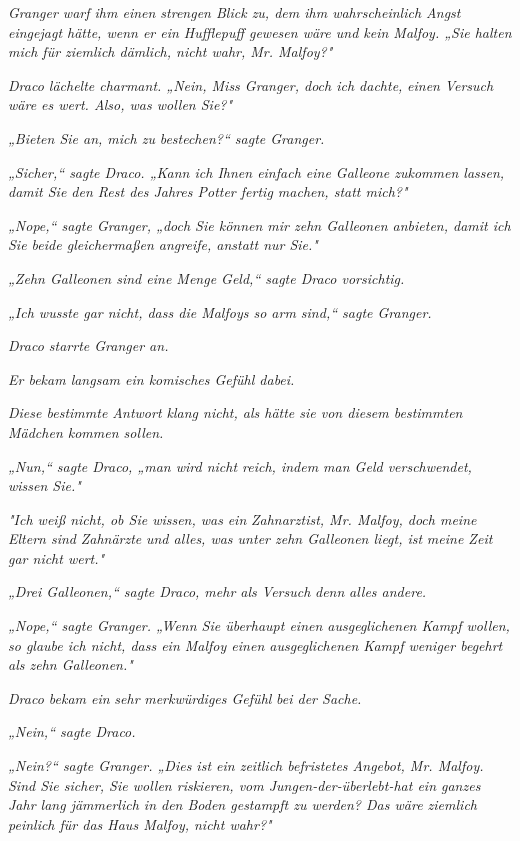 {\emph{Granger warf ihm einen strengen Blick zu, dem ihm wahrscheinlich Angst eingejagt hätte, wenn er ein Hufflepuff gewesen wäre und kein Malfoy. „Sie halten mich für ziemlich dämlich, nicht wahr, Mr. Malfoy?"}

\emph{Draco lächelte charmant. „Nein, Miss Granger, doch ich dachte,} \emph{einen} \emph{\emph{Versuch}} \emph{wäre es wert. Also, was wollen Sie?"}

\emph{„Bieten Sie an, mich zu} \emph{\emph{bestechen?}“ sagte Granger.}

\emph{„Sicher,“ sagte Draco. „Kann ich Ihnen einfach eine Galleone zukommen lassen, damit Sie den Rest des Jahres Potter fertig machen, statt mich?"}

\emph{„Nope,“ sagte Granger, „doch Sie können mir zehn Galleonen anbieten, damit ich Sie beide gleichermaßen angreife, anstatt nur Sie."}

\emph{„Zehn Galleonen sind eine Menge Geld,“ sagte Draco vorsichtig.}

\emph{„Ich wusste gar nicht, dass die Malfoys so arm sind,“ sagte Granger.}

\emph{Draco starrte Granger an.}

\emph{Er bekam langsam ein komisches Gefühl dabei.}

\emph{Diese bestimmte Antwort klang nicht, als hätte sie von diesem bestimmten Mädchen kommen sollen.}

\emph{„Nun,“ sagte Draco, „man wird nicht reich, indem man Geld verschwendet, wissen Sie."}

\emph{"Ich weiß nicht, ob Sie wissen, was} \emph{ein} \emph{Zahnarztist, Mr. Malfoy, doch meine Eltern sind} \emph{\emph{Zahnärzte}} \emph{und alles, was unter zehn Galleonen liegt, ist} \emph{meine Zeit gar nicht wert."}

\emph{„Drei Galleonen,“ sagte Draco, mehr als Versuch} \emph{denn} \emph{alles andere.}

\emph{„Nope,“ sagte Granger. „Wenn Sie überhaupt einen ausgeglichenen Kampf wollen, so glaube ich nicht, dass ein Malfoy einen ausgeglichenen Kampf weniger begehrt als zehn Galleonen."}

\emph{Draco bekam ein} \emph{\emph{sehr}} \emph{merkwürdiges Gefühl} \emph{bei der Sache.}

\emph{„Nein,“ sagte Draco.}

\emph{„Nein?“ sagte Granger. „Dies ist ein zeitlich befristetes Angebot, Mr. Malfoy. Sind Sie sicher, Sie wollen riskieren, vom Jungen-der-überlebt-hat ein ganzes Jahr lang jämmerlich in den Boden gestampft zu werden? Das wäre ziemlich peinlich für das Haus Malfoy, nicht wahr?"}

}
